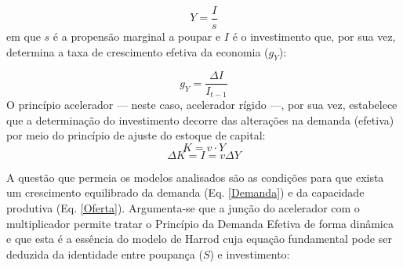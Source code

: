 \begin{equation}
\label{Demanda}
Y = \frac{I}{s}
\end{equation}
em que $s$ é a propensão marginal a poupar e $I$ é o investimento que, por sua vez, determina a taxa de crescimento efetiva da economia ($g_Y$):

\begin{equation}
\label{crescimento_efetivo}
	g_Y = \frac{\Delta I}{I_{t-1}}
\end{equation}
O princípio acelerador --- neste caso, acelerador rígido ---, por sua vez, estabelece que a determinação do investimento decorre das alterações na demanda (efetiva) por meio do princípio de ajuste do estoque de capital:
$$
K = v\cdot Y
$$
\begin{equation}
\Delta K = I = v\Delta Y
\end{equation}


A questão que permeia os modelos analisados são as condições para que exista um crescimento equilibrado da demanda (Eq. \ref{Demanda}) e da capacidade produtiva (Eq. \ref{Oferta}). 
Argumenta-se que a junção do acelerador com o multiplicador permite tratar o Princípio da Demanda Efetiva de forma dinâmica e que esta é a essência do modelo de Harrod cuja equação fundamental pode ser deduzida da identidade entre poupança ($S$) e investimento:

